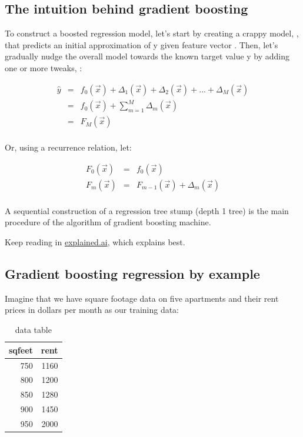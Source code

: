 \documentclass[]{book}
\theoremstyle{definition}
\theoremstyle{definition}
\theoremstyle{definition}
\theoremstyle{remark}
\begin{document}
\subsection{The intuition behind gradient
boosting}\label{the-intuition-behind-gradient-boosting}

To construct a boosted regression model, let's start by creating a
crappy model, , that predicts an initial approximation of y given
feature vector . Then, let's gradually nudge the overall model towards
the known target value y by adding one or more tweaks, :

\begin{eqnarray*}
\hat y & = & f_0(\vec x) + \Delta_1(\vec x) + \Delta_2(\vec x) + ...  +  \Delta_M(\vec x) \\
 & = & f_0(\vec x) + \sum_{m=1}^M  \Delta_m(\vec x)\\
 & = & F_M(\vec x)\\
\end{eqnarray*}

Or, using a recurrence relation, let:

\begin{eqnarray*}
F_0(\vec x) &=& f_0(\vec x)\\
F_m(\vec x) &=& F_{m-1}(\vec x) + \Delta_m(\vec x)\\
\end{eqnarray*}

A sequential construction of a regression tree stump (depth 1 tree) is
the main procedure of the algorithm of gradient boosting machine.

Keep reading in
\href{http://explained.ai/gradient-boosting/L2-loss.html}{explained.ai},
which explains best.

\subsection{Gradient boosting regression by
example}\label{gradient-boosting-regression-by-example}

Imagine that we have square footage data on five apartments and their
rent prices in dollars per month as our training data:

\begin{table}

\caption{\label{tab:unnamed-chunk-2}data table}
\centering
\begin{tabular}[t]{r|r}
\hline
sqfeet & rent\\
\hline
750 & 1160\\
\hline
800 & 1200\\
\hline
850 & 1280\\
\hline
900 & 1450\\
\hline
950 & 2000\\
\hline
\end{tabular}
\end{table}
\end{document}
